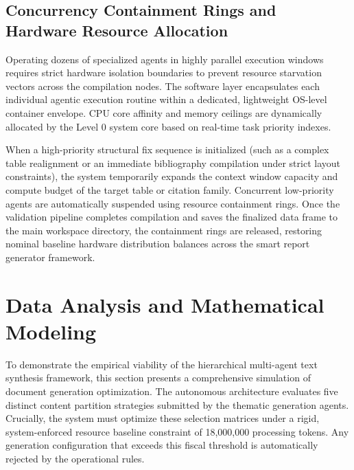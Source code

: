 \subsection{Concurrency Containment Rings and Hardware Resource Allocation}
Operating dozens of specialized agents in highly parallel execution windows requires strict hardware isolation boundaries to prevent resource starvation vectors across the compilation nodes. The software layer encapsulates each individual agentic execution routine within a dedicated, lightweight OS-level container envelope. CPU core affinity and memory ceilings are dynamically allocated by the Level 0 system core based on real-time task priority indexes.

When a high-priority structural fix sequence is initialized (such as a complex table realignment or an immediate bibliography compilation under strict layout constraints), the system temporarily expands the context window capacity and compute budget of the target table or citation family. Concurrent low-priority agents are automatically suspended using resource containment rings. Once the validation pipeline completes compilation and saves the finalized data frame to the main workspace directory, the containment rings are released, restoring nominal baseline hardware distribution balances across the smart report generator framework.

\section{Data Analysis and Mathematical Modeling}
To demonstrate the empirical viability of the hierarchical multi-agent text synthesis framework, this section presents a comprehensive simulation of document generation optimization. The autonomous architecture evaluates five distinct content partition strategies submitted by the thematic generation agents. Crucially, the system must optimize these selection matrices under a rigid, system-enforced resource baseline constraint of 18,000,000 processing tokens. Any generation configuration that exceeds this fiscal threshold is automatically rejected by the operational rules.

